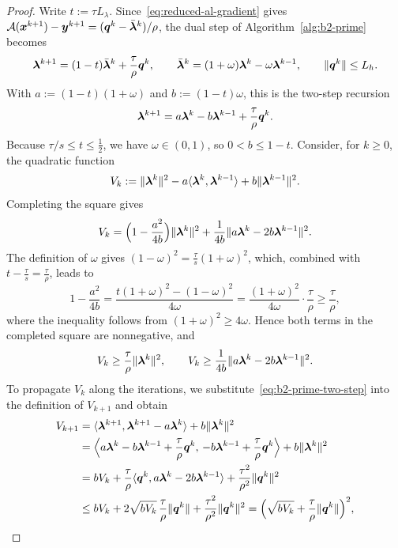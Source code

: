 \begin{proof}
Write \(t:=\tau L_\lambda\). Since~\eqref{eq:reduced-al-gradient} gives
\(\mathcal{A}(\bm{x}^{k+1})-\bm{y}^{k+1}=(\bm{q}^k-\bar{\bm{\lambda}}^k)/\rho\), the dual
step of Algorithm~\ref{alg:b2-prime} becomes
\[
    \bm{\lambda}^{k+1}=(1-t)\bar{\bm{\lambda}}^k+\frac{\tau}{\rho}\bm{q}^k,
    \qquad
    \bar{\bm{\lambda}}^k=(1+\omega)\bm{\lambda}^k-\omega\bm{\lambda}^{k-1},
    \qquad \|\bm{q}^k\|\le L_h.
\]
With \(a:=(1-t)(1+\omega)\) and \(b:=(1-t)\omega\), this is the two-step
recursion
\begin{equation}
    \bm{\lambda}^{k+1}=a\bm{\lambda}^k-b\bm{\lambda}^{k-1}+\frac{\tau}{\rho}\bm{q}^k .
    \label{eq:b2-prime-two-step}
\end{equation}
Because \(\tau/s\le t\le\frac12\), we have \(\omega\in(0,1)\), so
\(0<b\le1-t\). Consider, for \(k\ge0\), the quadratic function
\[
    V_k:=\|\bm{\lambda}^k\|^2
    -a\langle\bm{\lambda}^k,\bm{\lambda}^{k-1}\rangle 
    +b\|\bm{\lambda}^{k-1}\|^2 .
\]
Completing the square gives
\[
    V_k=\Bigl(1-\frac{a^2}{4b}\Bigr)\|\bm{\lambda}^k\|^2
    +\frac{1}{4b}\|a\bm{\lambda}^k-2b\bm{\lambda}^{k-1}\|^2 .
\]
The definition of \(\omega\) gives
\((1-\omega)^2=\frac{\tau}{s}(1+\omega)^2\), which, combined with
\(t-\frac{\tau}{s}=\frac{\tau}{\rho}\), leads to
\[
    1-\frac{a^2}{4b}
    =\frac{t(1+\omega)^2-(1-\omega)^2}{4\omega}
    =\frac{(1+\omega)^2}{4\omega}\cdot\frac{\tau}{\rho}
    \ge\frac{\tau}{\rho},
\]
where the inequality follows from \((1+\omega)^2\ge4\omega\). Hence both terms
in the completed square are nonnegative, and
\begin{equation}
    V_k\ge\frac{\tau}{\rho}\|\bm{\lambda}^k\|^2,
    \qquad
    V_k\ge\frac{1}{4b}\|a\bm{\lambda}^k-2b\bm{\lambda}^{k-1}\|^2 .
    \label{eq:b2-prime-V-squares}
\end{equation}
To propagate \(V_k\) along the iterations, we substitute~\eqref{eq:b2-prime-two-step}
into the definition of \(V_{k+1}\) and obtain
\begin{align*}
    V_{k+1}
    &=\langle\bm{\lambda}^{k+1},\bm{\lambda}^{k+1}-a\bm{\lambda}^k\rangle+b\|\bm{\lambda}^k\|^2\\
    &=\Bigl\langle a\bm{\lambda}^k-b\bm{\lambda}^{k-1}+\frac{\tau}{\rho}\bm{q}^k,\,
    -b\bm{\lambda}^{k-1}+\frac{\tau}{\rho}\bm{q}^k\Bigr\rangle+b\|\bm{\lambda}^k\|^2\\
    &=bV_k+\frac{\tau}{\rho}\langle\bm{q}^k,a\bm{\lambda}^k-2b\bm{\lambda}^{k-1}\rangle
    +\frac{\tau^2}{\rho^2}\|\bm{q}^k\|^2\\
    &\le bV_k+2\sqrt{bV_k}\,\frac{\tau}{\rho}\|\bm{q}^k\|
    +\frac{\tau^2}{\rho^2}\|\bm{q}^k\|^2
    =\Bigl(\sqrt{bV_k}+\frac{\tau}{\rho}\|\bm{q}^k\|\Bigr)^2,
\end{align*}

\end{proof}
